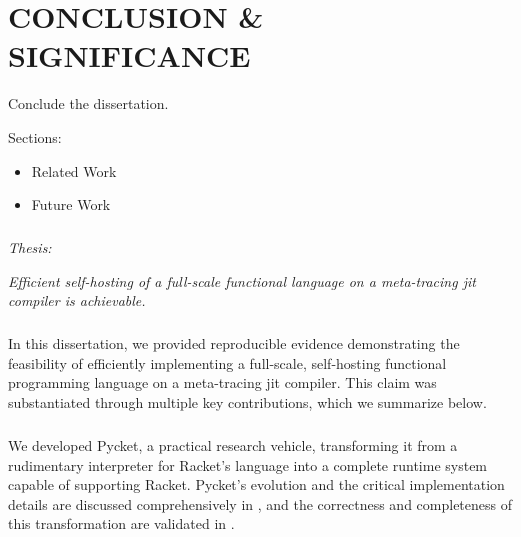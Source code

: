 \chapter[\texorpdfstring{CONCLUSION \& SIGNIFICANCE}
                          {8. Conclusion}]{CONCLUSION \& SIGNIFICANCE}

    \label{chapter:conclusion}

    \begin{chaptersynopsis}
        Conclude the dissertation.

        \vspace{2em}

        Sections:
		\begin{itemize}
			\item Related Work
			\item Future Work
		\end{itemize}
    \end{chaptersynopsis}

    \paragraph{} \textit{Thesis:}

    \textit{Efficient self-hosting of a full-scale functional language on a meta-tracing \gls{jit} compiler is achievable.}

    \paragraph{}%
        In this dissertation, we provided reproducible evidence demonstrating the feasibility of efficiently implementing a full-scale, self-hosting functional programming language on a meta-tracing \gls{jit} compiler. This claim was substantiated through multiple key contributions, which we summarize below.

    \paragraph{}%
        We developed Pycket, a practical research vehicle, transforming it from a rudimentary interpreter for Racket's  language into a complete runtime system capable of supporting Racket. Pycket's evolution and the critical implementation details are discussed comprehensively in , and the correctness and completeness of this transformation are validated in .

